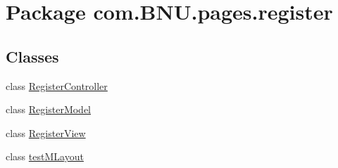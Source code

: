 \hypertarget{namespacecom_1_1_b_n_u_1_1pages_1_1register}{}\section{Package com.\+B\+N\+U.\+pages.\+register}
\label{namespacecom_1_1_b_n_u_1_1pages_1_1register}
\subsection*{Classes}
\begin{DoxyCompactItemize}
\item 
class \mbox{\hyperlink{classcom_1_1_b_n_u_1_1pages_1_1register_1_1_register_controller}{Register\+Controller}}
\item 
class \mbox{\hyperlink{classcom_1_1_b_n_u_1_1pages_1_1register_1_1_register_model}{Register\+Model}}
\item 
class \mbox{\hyperlink{classcom_1_1_b_n_u_1_1pages_1_1register_1_1_register_view}{Register\+View}}
\item 
class \mbox{\hyperlink{classcom_1_1_b_n_u_1_1pages_1_1register_1_1test_m_layout}{test\+M\+Layout}}
\end{DoxyCompactItemize}
